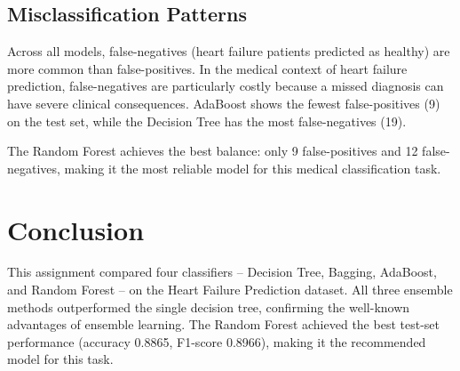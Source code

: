 \documentclass[12pt,a4paper]{article}
\begin{document}
\subsection{Misclassification Patterns}

Across all models, false-negatives (heart failure patients predicted as healthy) are more
common than false-positives. In the medical context of heart failure prediction, false-negatives
are particularly costly because a missed diagnosis can have severe clinical consequences.
AdaBoost shows the fewest false-positives (9) on the test set, while the Decision Tree has
the most false-negatives (19).

The Random Forest achieves the best balance: only 9 false-positives and 12 false-negatives,
making it the most reliable model for this medical classification task.

\section{Conclusion}

This assignment compared four classifiers -- Decision Tree, Bagging, AdaBoost, and
Random Forest -- on the Heart Failure Prediction dataset. All three ensemble methods
outperformed the single decision tree, confirming the well-known advantages of ensemble
learning. The Random Forest achieved the best test-set performance (accuracy 0.8865,
F1-score 0.8966), making it the recommended model for this task.
\end{document}

